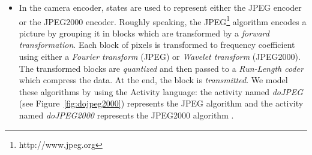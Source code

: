 \begin{itemize}
	\item In the camera encoder, states are used to represent either the JPEG encoder or the JPEG2000 encoder. Roughly speaking, the JPEG\footnote{http://www.jpeg.org} algorithm encodes a picture by grouping it in blocks which are transformed by a \textit{forward transformation}. Each block of pixels is transformed to frequency coefficient using either a \textit{Fourier transform} (JPEG) or \textit{Wavelet transform} (JPEG2000). The transformed blocks are \textit{quantized} and then passed to a \textit{Run-Length coder} which compress the data. At the end, the block is \textit{transmitted}. We model these algorithms by using the Activity language: the activity named \emph{doJPEG} (see Figure~\ref{fig:dojpeg2000}) represents the JPEG algorithm and the activity named \emph{doJPEG2000} represents the JPEG2000 algorithm . 



\end{itemize}
